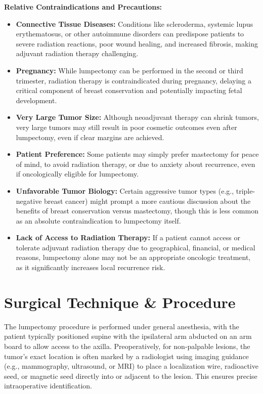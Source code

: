 \textbf{Relative Contraindications and Precautions:}
\begin{itemize}
  \item \textbf{Connective Tissue Diseases:} Conditions like scleroderma, systemic lupus erythematosus, or other autoimmune disorders can predispose patients to severe radiation reactions, poor wound healing, and increased fibrosis, making adjuvant radiation therapy challenging.
  
  \item \textbf{Pregnancy:} While lumpectomy can be performed in the second or third trimester, radiation therapy is contraindicated during pregnancy, delaying a critical component of breast conservation and potentially impacting fetal development.
  
  \item \textbf{Very Large Tumor Size:} Although neoadjuvant therapy can shrink tumors, very large tumors may still result in poor cosmetic outcomes even after lumpectomy, even if clear margins are achieved.
  
  \item \textbf{Patient Preference:} Some patients may simply prefer mastectomy for peace of mind, to avoid radiation therapy, or due to anxiety about recurrence, even if oncologically eligible for lumpectomy.
  
  \item \textbf{Unfavorable Tumor Biology:} Certain aggressive tumor types (e.g., triple-negative breast cancer) might prompt a more cautious discussion about the benefits of breast conservation versus mastectomy, though this is less common as an absolute contraindication to lumpectomy itself.
  
  \item \textbf{Lack of Access to Radiation Therapy:} If a patient cannot access or tolerate adjuvant radiation therapy due to geographical, financial, or medical reasons, lumpectomy alone may not be an appropriate oncologic treatment, as it significantly increases local recurrence risk.
\end{itemize}

\section*{Surgical Technique \& Procedure}
The lumpectomy procedure is performed under general anesthesia, with the patient typically positioned supine with the ipsilateral arm abducted on an arm board to allow access to the axilla. Preoperatively, for non-palpable lesions, the tumor's exact location is often marked by a radiologist using imaging guidance (e.g., mammography, ultrasound, or MRI) to place a localization wire, radioactive seed, or magnetic seed directly into or adjacent to the lesion. This ensures precise intraoperative identification.

